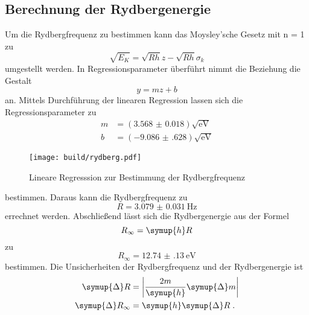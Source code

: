 \subsection{Berechnung der Rydbergenergie}
Um die Rydbergfrequenz zu bestimmen kann das Moysley'sche Gesetz mit n = 1 zu 
\begin{equation}
    \sqrt{E_K} = \sqrt{Rh}z - \sqrt{Rh}\sigma_k
\end{equation}
umgestellt werden.
In Regressionsparameter überführt nimmt die Beziehung die Gestalt
\begin{equation}
    y = mz+b
\end{equation}
an.
Mittels Durchführung der linearen Regression lassen sich die Regressionsparameter zu 
\begin{align*}
        m & = \left( \num{3.568(18)} \right)   \sqrt{\si{\electronvolt}} \\
        b & = \left( \num{-9.086(628)} \right) \sqrt{\si{\electronvolt}}
\end{align*}
\begin{figure}
    \centering
    \caption{Lineare Regresssion zur Bestimmung der Rydbergfrequenz}
    \label{fig:rydberg}
    \texttt{[image: build/rydberg.pdf]}
\end{figure}
bestimmen.
Daraus kann die Rydbergfrequenz zu 
\begin{equation*}
    R = \SI{3.079(31)}{\hertz}
\end{equation*}
errechnet werden.
Abschließend lässt sich die Rydbergenergie aus der Formel
\begin{equation}
    R_\infty = \symup{h}R
\end{equation}
zu
\begin{equation*}
    R_\infty = \SI{12.74(13)}{\electronvolt}
\end{equation*}
bestimmen.
Die Unsicherheiten der Rydbergfrequenz und der Rydbergenergie ist
\begin{align}
    \symup{\Delta} R        & = \left | \frac{2m}{\symup{h}} \symup{\Delta}m \right | \\
    \symup{\Delta} R_\infty & = \symup{h} \symup{\Delta} R \; \text{.}
\end{align}